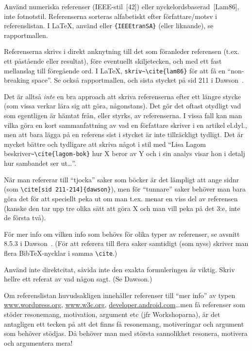 \documentclass[swedish, a4paper,12pt]{article}
\begin{document}
Använd numeriska referenser (IEEE-stil~[42]) eller nyckelordsbaserad~[Lam86], inte fotnotstil. Referenserna sorteras alfabetiskt efter författare/motsv i referenslistan. I LaTeX, använd \verb|| eller \verb|{IEEEtranSA}| (eller liknande), se rapportmallen.

Referenserna skrivs i direkt anknytning till det som föranleder referensen (t.ex. ett påstående eller resultat), före eventuellt skiljetecken, och med ett fast mellanslag till föregående ord. I LaTeX, \verb|skriv~\cite{lam86}| för att få en ``non-breaking space''. Se också rapportmallen, och sista stycket på sid 211 i Dawson~\cite{dawson:projects-in-computing}.

Det är alltså \emph{inte} en bra approach att skriva referenserna efter ett längre stycke (som vissa verkar lära sig att göra, någonstans). Det gör det oftast otydligt vad som egentligen är hämtat från, eller styrks, av referenserna. I vissa fall kan man vilka göra en kort sammanfattning av vad en författare skriver i en artikel el.dyl., men att bara lägga på en referens sist i stycket är inte tillräckligt tydligt. Det är mycket bättre och tydligare att skriva något i stil med ``Lisa Lagom beskriver\verb|~\cite{lagom-bok}| hur X beror av Y och i sin analys visar hon i detalj hur sambandet ser ut\ldots''.

När man refererar till ``tjocka'' saker som böcker är det lämpligt att ange sidnr
(som \verb|\cite[sid 211-214]{dawson}|), men för ``tunnare'' saker behöver man bara göra det för att speciellt peka ut om man t.ex. menar en viss del av referensen (kanske den tar upp tre olika sätt att göra X och man vill peka på det 3:e, inte de första två).

För mer info om vilken info som behövs för olika typer av referenser, se avsnitt 8.5.3 i Dawson~\cite{dawson:projects-in-computing,dawson:projects-in-computing-old}. (För att referera till flera saker samtidigt (som nyss) skriver man flera BibTeX-nycklar i samma \verb|\cite|.)

Använd inte direktcitat, såvida inte den exakta formuleringen är viktig.  Skriv hellre ett referat av vad någon sagt. (Se Dawson.)

Om referenslistan huvudsakligen innehåller referenser till ``mer info'' av typen
\url{www.wordpress.org}, \url{www.w3c.org}, \url{developer.android.com}\ldots men få referenser som stöder resonemang, motivation, argument etc (jfr Workshoparna), är det antagligen ett tecken på att det finns få resonemang, motiveringar och argument som behöver stödjas. Då behöver man med största sannolikhet resonera, motivera och argumentera mera!
\end{document}
